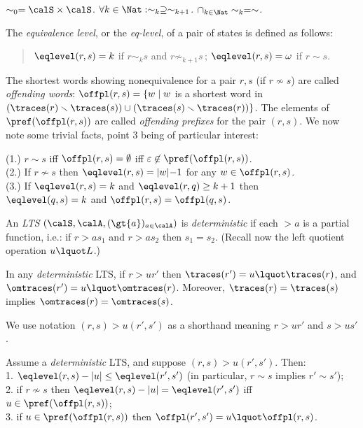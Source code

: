\documentclass[12pt]{article}
\begin{document}
\begin{observ}\label{prop:basicstratif}
$\sim_0=\calS\times\calS$.
$\forall k\in\Nat: \sim_k\supseteq \sim_{k+1}$.
$\cap_{k\in\Nat}\sim_k=\sim$.


\end{observ}
The \emph{equivalence level}, or the \emph{eq-level},
of a pair of states is defined as follows:
\begin{quote}
$\eqlevel(r,s)=k$ if $r\sim_k s$ and $r\not\sim_{k+1} s$\,;
$\eqlevel(r,s)=\omega$ if $r\sim s$.
\end{quote}
The shortest words 
showing nonequivalence for a pair $r,s$ (if $r\not\sim s$)
are called \emph{offending words}:
$\offpl(r,s)=\{w\mid w$ is a shortest word in 
$(\traces(r)\smallsetminus\traces(s))\cup
(\traces(s)\smallsetminus\traces(r))\}$. 
The elements of $\pref(\offpl(r,s))$ are called \emph{offending
prefixes} for the pair $(r,s)$.
We now note some trivial facts, point $3$ being of particular 
interest:

\begin{observ}\label{prop:basicoffwords}
(1.) $r\sim s$ iff $\offpl(r,s)=\emptyset$ iff $\varepsilon\not\in \pref(\offpl(r,s))$.
\\
(2.) If $r\not\sim s$ then $\eqlevel(r,s)=|w|{-}1$ for any
$w\in\offpl(r,s)$.
\\
(3.) If $\eqlevel(r,s)=k$ and $\eqlevel(r,q)\geq k+1$ then 
\\
\hspace*{3em}$\eqlevel(q,s)=k$ and $\offpl(r,s)=\offpl(q,s)$. 
\end{observ}
An \emph{LTS}  $(\calS,\calA,(\gt{a})_{a\in\calA})$ is 
\emph{deterministic} 
if each $\gt{a}$ is a partial
function, i.e.:
if $r\gt{a}s_1$ and $r\gt{a}s_2$ then
$s_1=s_2$. (Recall now the left quotient operation $u\lquot L$.)

\begin{observ}\label{prop:basicquottraces}
In any \emph{deterministic} LTS,
if $r\gt{u} r'$ then 
$\traces(r')=u\lquot \traces(r)$, and
$\omtraces(r')=u\lquot \omtraces(r)$.
Moreover, $\traces(r)=\traces(s)$ implies  
$\omtraces(r)=\omtraces(s)$.
\end{observ}
We use notation $(r,s)\gt{u} (r',s')$ as a shorthand meaning
$r\gt{u} r'$ and $s\gt{u} s'$. 

\begin{prop}\label{prop:basiceqleveldrop}
Assume a \emph{deterministic} LTS, and suppose
$(r,s)\gt{u} (r',s')$. Then:
\\
1. $\eqlevel(r,s)-|u|\leq \eqlevel(r',s')$ 
(in particular, $r\sim s$ implies
$r'\sim s'$);
\\
2. if $r\not\sim s$ then 
$\eqlevel(r,s)-|u|= \eqlevel(r',s')$ iff 
$u\in\pref(\offpl(r,s))$; 
\\
3. if $u\in\pref(\offpl(r,s))$ then 
$\offpl(r',s')=u\lquot\offpl(r,s)$.
\end{prop}
\end{document}
